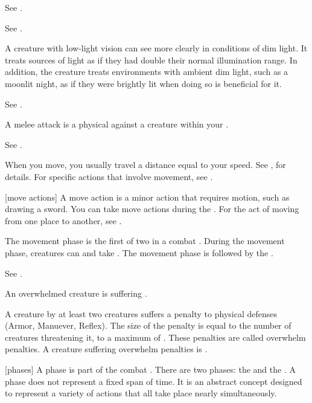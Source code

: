  See .

 See .

 A creature with low-light vision can see more clearly in conditions of dim light.
It treats sources of light as if they had double their normal illumination range.
In addition, the creature treats environments with ambient dim light, such as a moonlit night, as if they were brightly lit when doing so is beneficial for it.

 See .

 A melee attack is a physical  against a creature within your .

 See .

 When you move, you usually travel a distance equal to your speed.
See , for details.
For specific actions that involve movement, see .

[move actions] A move action is a minor action that requires motion, such as drawing a sword.
You can take move actions during the .
For the act of moving from one place to another, see .

 The movement phase is the first of two  in a combat .
During the movement phase, creatures can  and take .
The movement phase is followed by the .

 See .

 An overwhelmed creature is suffering .

 A creature  by at least two creatures suffers a penalty to physical defenses (Armor, Manuever, Reflex).
The size of the penalty is equal to the number of creatures threatening it, to a maximum of .
These penalties are called overwhelm penalties.
A creature suffering overwhelm penalties is .

[phases] A phase is part of the combat .
There are two phases: the  and the .
A phase does not represent a fixed span of time.
It is an abstract concept designed to represent a variety of actions that all take place nearly simultaneously.


